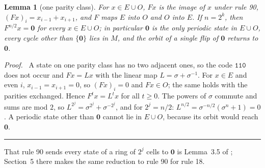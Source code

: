 \documentclass[10pt,a4paper]{article}
\newtheorem{lemma}[theorem]{Lemma}
\newcommand{\qedmark}{\rule{1.1ex}{1.1ex}}
\newenvironment{proof}[1][Proof]{\par\smallskip\noindent\textit{#1.}\ }{\hfill\qedmark\par\smallskip}
\newcommand{\zero}{\mathbf{0}}                %
\newcommand{\code}[1]{\mathtt{#1}}            %
\begin{document}
\begin{lemma}[one parity class]\label{26:lem:parity}
For $x\in E\cup O$, $Fx$ is the image of $x$ under rule 90, $(Fx)_i=x_{i-1}+x_{i+1}$, and $F$ maps $E$ into $O$ and
$O$ into $E$. If $n=2^k$, then $F^{n/2}x=\zero$ for every $x\in E\cup O$; in particular $\zero$ is the only periodic
state in $E\cup O$, every cycle other than $\{\zero\}$ lies in $M$, and the orbit of a single flip of $\zero$ returns
to $\zero$.
\end{lemma}
\begin{proof}
A state on one parity class has no two adjacent ones, so the code $\code{110}$ does not occur and $Fx=Lx$ with the
linear map $L=\sigma+\sigma^{-1}$. For $x\in E$ and even $i$, $x_{i-1}=x_{i+1}=0$, so $(Fx)_i=0$ and $Fx\in O$; the
same holds with the parities exchanged. Hence $F^tx=L^tx$ for all $t\ge0$. The powers of $\sigma$ commute and sums are
mod $2$, so $L^{2^j}=\sigma^{2^j}+\sigma^{-2^j}$, and for $2^j=n/2$: $L^{n/2}=\sigma^{-n/2}(\sigma^n+1)=0$. A periodic
state other than $\zero$ cannot lie in $E\cup O$, because its orbit would reach $\zero$.
\end{proof}
\noindent That rule 90 sends every state of a ring of $2^j$ cells to $\zero$ is Lemma~3.5 of
\cite{MartinOdlyzkoWolfram1984}; Section~5 there makes the same reduction to rule 90 for rule 18.
\end{document}
